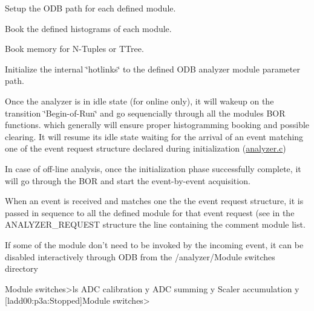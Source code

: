 \begin{DoxyItemize}
\begin{DoxyEnumerate}
\item Setup the ODB path for each defined module.
\item Book the defined histograms of each module.
\item Book memory for N-\/Tuples or TTree.
\item Initialize the internal \char`\"{}hotlinks\char`\"{} to the defined ODB analyzer module parameter path.
\begin{DoxyItemize}
\item Once the analyzer is in idle state (for online only), it will wakeup on the transition \char`\"{}Begin-\/of-\/Run\char`\"{} and go sequencially through all the modules BOR functions. which generally will ensure proper histogramming booking and possible clearing. It will resume its idle state waiting for the arrival of an event matching one of the event request structure declared during initialization (\hyperlink{analyzer_8c}{analyzer.c})
\end{DoxyItemize}
\end{DoxyEnumerate}
\begin{DoxyItemize}
\item In case of off-\/line analysis, once the initialization phase successfully complete, it will go through the BOR and start the event-\/by-\/event acquisition. 
\begin{DoxyCode}
 INT analyzer_init()
 {
   HNDLE hDB, hKey;
   char str[80];

   RUNINFO_STR(runinfo_str);
   EXP_PARAM_STR(exp_param_str);
   GLOBAL_PARAM_STR(global_param_str);
   TRIGGER_SETTINGS_STR(trigger_settings_str);

   /* open ODB structures */
   cm_get_experiment_database(&hDB, NULL);
   db_create_record(hDB, 0, "/Runinfo", strcomb(runinfo_str));
   db_find_key(hDB, 0, "/Runinfo", &hKey);
   if (db_open_record(hDB, hKey, &runinfo, sizeof(runinfo), MODE_READ, NULL, NULL
      ) !=
     DB_SUCCESS) {
    cm_msg(MERROR, "analyzer_init", "Cannot open \"/Runinfo\" tree in ODB");
    return 0;
   }
\end{DoxyCode}

\end{DoxyItemize}
\begin{DoxyEnumerate}
\item When an event is received and matches one the the event request structure, it is passed in sequence to all the defined module for that event request (see in the ANALYZER\_\-REQUEST structure the line containing the comment module list.
\begin{DoxyItemize}
\item If some of the module don't need to be invoked by the incoming event, it can be disabled interactively through ODB from the /analyzer/Module switches directory 
\begin{DoxyCode}
   Module switches>ls
   ADC calibration                 y
   ADC summing                     y
   Scaler accumulation             y
   [ladd00:p3a:Stopped]Module switches>
\end{DoxyCode}


\end{DoxyItemize}
\end{DoxyEnumerate}
\end{DoxyItemize}
